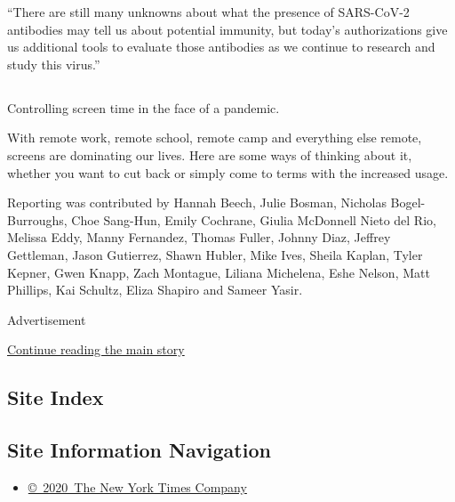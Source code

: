 ``There are still many unknowns about what the presence of SARS-CoV-2
antibodies may tell us about potential immunity, but today's
authorizations give us additional tools to evaluate those antibodies as
we continue to research and study this virus.''

\hypertarget{-12}{%
\subsection{}\label{-12}}

Controlling screen time in the face of a pandemic.

With remote work, remote school, remote camp and everything else remote,
screens are dominating our lives. Here are some ways of thinking about
it, whether you want to cut back or simply come to terms with the
increased usage.

Reporting was contributed by Hannah Beech, Julie Bosman, Nicholas
Bogel-Burroughs, Choe Sang-Hun, Emily Cochrane, Giulia McDonnell Nieto
del Rio, Melissa Eddy, Manny Fernandez, Thomas Fuller, Johnny Diaz,
Jeffrey Gettleman, Jason Gutierrez, Shawn Hubler, Mike Ives, Sheila
Kaplan, Tyler Kepner, Gwen Knapp, Zach Montague, Liliana Michelena, Eshe
Nelson, Matt Phillips, Kai Schultz, Eliza Shapiro and Sameer Yasir.

Advertisement

\protect\hyperlink{after-bottom}{Continue reading the main story}

\hypertarget{site-index}{%
\subsection{Site Index}\label{site-index}}

\hypertarget{site-information-navigation}{%
\subsection{Site Information
Navigation}\label{site-information-navigation}}

\begin{itemize}
\tightlist
\item
  \href{https://help.nytimes.com/hc/en-us/articles/115014792127-Copyright-notice}{©~2020~The
  New York Times Company}
\end{itemize}

